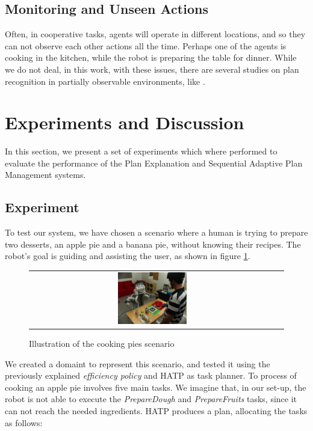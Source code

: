 \subsection{Monitoring and Unseen Actions}
Often, in cooperative tasks, agents will operate in different locations, and so they can not observe each other actions all the time. Perhaps one of the agents is cooking in the kitchen,  while the robot is preparing the table for dinner. While we do not deal, in this work, with these issues, there are several studies on plan recognition in partially observable environments, like \cite{geib2005partial}.

\section{Experiments and Discussion}
\label{sec:plan_management-experiments}
In this section, we present a set of experiments which where performed to evaluate the performance of the Plan Explanation and Sequential Adaptive Plan Management systems.

 \subsection{Experiment}
 \label{sec:plan_management-experiment}
To test our system, we have chosen a scenario where a human is trying to prepare two desserts, an apple pie and a banana pie, without knowing their recipes. The robot's goal is guiding and assisting the user, as shown in figure \ref{fig:plan_management-scenario}. 

\begin{figure}[ht!]

 \centering
 \begin{tabular}{cc}
  \includegraphics[width=0.29\textwidth]{img/plan_management/scenario.JPG}
 \end{tabular}
 \caption{Illustration of the cooking pies scenario}
 \label{fig:plan_management-scenario}
 \end{figure}

We created a domaint to represent this scenario, and tested it using the previously explained \textit{efficiency policy} and HATP as task planner. To process of cooking an apple pie involves five main tasks. We imagine that, in our set-up, the robot is not able to execute the \textit{PrepareDough} and \textit{PrepareFruits} tasks, since it can not reach the needed ingredients. HATP produces a plan, allocating the tasks as follows:


